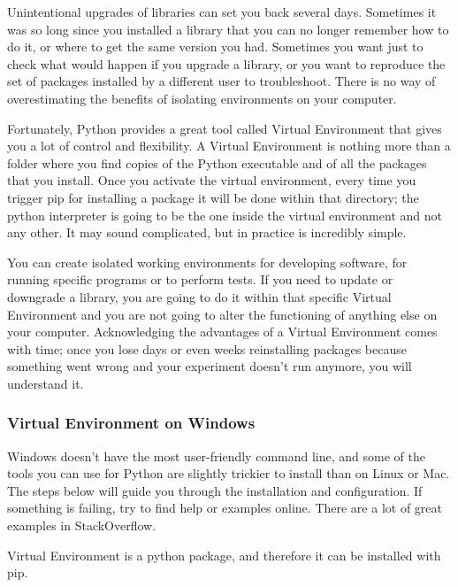 Unintentional upgrades of libraries can set you back several days. Sometimes it was so long since you installed a library that you can no longer remember how to do it, or where to get the same version you had. Sometimes you want just to check what would happen if you upgrade a library, or you want to reproduce the set of packages installed by a different user to troubleshoot. There is no way of overestimating the benefits of isolating environments on your computer. 

Fortunately, Python provides a great tool called Virtual Environment that gives you a lot of control and flexibility. A Virtual Environment is nothing more than a folder where you find copies of the Python executable and of all the packages that you install. Once you activate the virtual environment, every time you trigger pip for installing a package it will be done within that directory; the python interpreter is going to be the one inside the virtual environment and not any other. It may sound complicated, but in practice is incredibly simple.

You can create isolated working environments for developing software, for running specific programs or to perform tests. If you need to update or downgrade a library, you are going to do it within that specific Virtual Environment and you are not going to alter the functioning of anything else on your computer. Acknowledging the advantages of a Virtual Environment comes with time; once you lose days or even weeks reinstalling packages because something went wrong and your experiment doesn’t run anymore, you will understand it.


\subsubsection{Virtual Environment on Windows}
Windows doesn’t have the most user-friendly command line, and some of the tools you can use for Python are slightly trickier to install than on Linux or Mac. The steps below will guide you through the installation and configuration. If something is failing, try to find help or examples online. There are a lot of great examples in StackOverflow.

Virtual Environment is a python package, and therefore it can be installed with pip.


